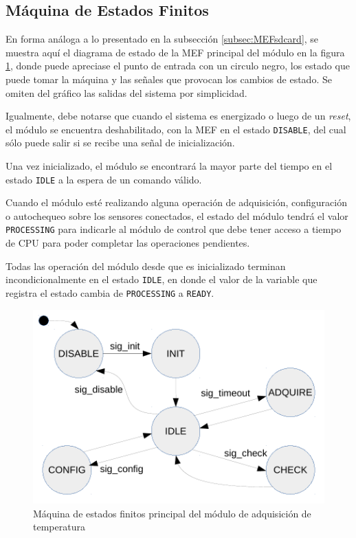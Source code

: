 \subsection{Máquina de Estados Finitos}

En forma análoga a lo presentado en la subsección \ref{subsec:MEFsdcard}, se muestra aquí el diagrama de estado de la MEF principal del módulo en la figura \ref{fig:mef_adquisicion}, donde puede apreciase el punto de entrada con un circulo negro, los estado que puede tomar la máquina y las señales que provocan los cambios de estado. Se omiten del gráfico las salidas del sistema por simplicidad. 

Igualmente, debe notarse que cuando el sistema es energizado o luego de un \textit{reset}, el módulo se encuentra deshabilitado, con la MEF en el estado \texttt{DISABLE}, del cual sólo puede salir si se recibe una señal de inicialización.  

Una vez inicializado, el módulo se encontrará la mayor parte del tiempo en el estado \texttt{IDLE} a la espera de un comando válido.  

Cuando el módulo esté realizando alguna operación de adquisición, configuración o autochequeo sobre los sensores conectados, el estado del módulo tendrá el valor \texttt{PROCESSING} para indicarle al módulo de control que debe tener acceso a tiempo de CPU para poder completar las operaciones pendientes.  

Todas las operación del módulo desde que es inicializado terminan incondicionalmente en el estado \texttt{IDLE}, en donde el valor de la variable que registra el estado cambia de \texttt{PROCESSING} a \texttt{READY}.

\begin{figure}[htpb]
	\centering
	\includegraphics[width=\textwidth]{./Figures/MEF_adquisicion.pdf}
	\caption[MEF principal del módulo de adquisición de temperatura]{Máquina de estados finitos principal del módulo de adquisición de temperatura}
	\label{fig:mef_adquisicion}
\end{figure}

